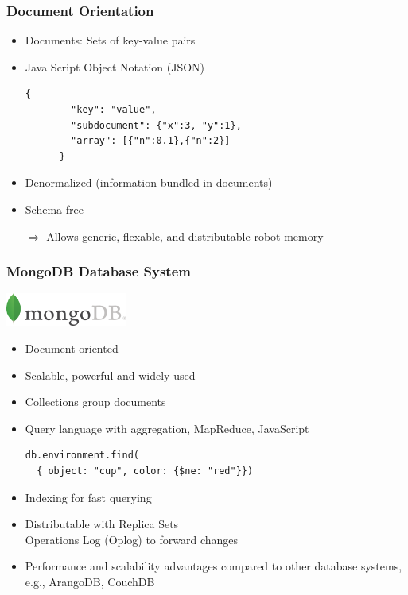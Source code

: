 \begin{frame}[fragile]
  \frametitle{Document Orientation}

  \begin{itemize}
  \item Documents: Sets of key-value pairs
  \item Java Script Object Notation (JSON)
    \begin{lstlisting}[style=SmallJSON,linewidth=8.5cm,
      label=lst:json,
      framexleftmargin=1pt, xleftmargin=0pt,
      morekeywords={}, numbers=none]
      {
        "key": "value",
        "subdocument": {"x":3, "y":1},
        "array": [{"n":0.1},{"n":2}]
      }
    \end{lstlisting}
  \item Denormalized (information bundled in documents)
  \item Schema free
  \end{itemize}
  \begin{itemize}
  \item[$\Rightarrow$] Allows generic, flexable, and distributable robot memory
  \end{itemize}
\end{frame}

\begin{frame}[fragile]
  \frametitle{MongoDB Database System}
  \hfill\includegraphics[width=0.3\textwidth]{../thesis/img/mongodb}
  \begin{itemize}
    \item Document-oriented
    \item Scalable, powerful and widely used
    \item Collections group documents
    \item Query language with aggregation, MapReduce, JavaScript %
\begin{lstlisting}[style=SmallJSON,linewidth=8.5cm,
  framexleftmargin=2pt, xleftmargin=10pt,
 morekeywords={}, numbers=none]
db.environment.find(
  { object: "cup", color: {$ne: "red"}})
\end{lstlisting}%
    \item Indexing for fast querying
    \item Distributable with Replica Sets\\ %
      Operations Log (Oplog) to forward changes
    \item Performance and scalability advantages compared to other database systems, e.g., ArangoDB, CouchDB\\\cite{arango-vs-mongo,db-comparison}
  \end{itemize}
\end{frame}

